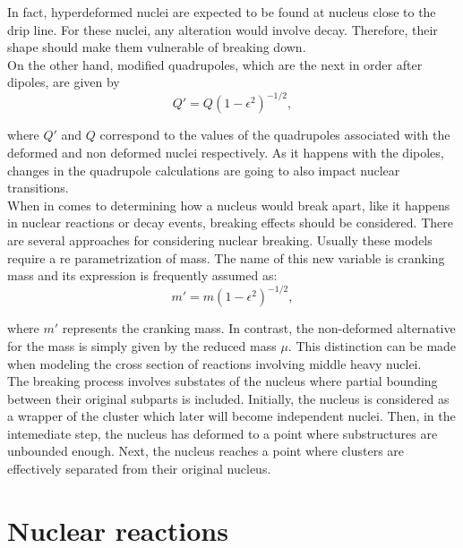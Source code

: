 \documentclass[openany]{book}
\begin{document}
In fact, hyperdeformed nuclei are expected to be found at nucleus close to the drip line. For these nuclei, any alteration would involve decay. Therefore, their shape should make them vulnerable of breaking down. \\

On the other hand, modified quadrupoles, which are the next in order after dipoles,  are given by \\

 \begin{equation}\label{eq:nuclearDeformation_quadrupole}
 	Q' = Q (1 - \epsilon^2)^{-1/2},
 \end{equation} 

where $Q'$ and $Q$ correspond to the values of the quadrupoles associated with the deformed and non deformed nuclei respectively. As it happens with the dipoles, changes in the quadrupole calculations are going to also impact nuclear transitions. \\

When in comes to determining how a nucleus would break apart, like it happens in nuclear reactions or decay events, breaking effects should be considered. There are several approaches for considering nuclear breaking. Usually these models require a re parametrization of mass. The name of this new variable is cranking mass and its expression is frequently assumed as: \\

 \begin{equation}\label{eq:nuclearDeformation_mass}
	m' = m(1 - \epsilon^2)^{-1/2},
\end{equation} 

where $m'$ represents the cranking mass. In contrast, the non-deformed alternative for the mass is simply given by the reduced mass $\mu$. This distinction can be made when modeling the cross section of reactions involving middle heavy nuclei. \\

The breaking process involves substates of the nucleus where partial bounding between their original subparts is included. Initially, the nucleus is considered as a wrapper of the cluster which later will become independent nuclei. Then, in the intemediate step, the nucleus has deformed to a point where substructures are unbounded enough. Next, the nucleus reaches a point where clusters are effectively separated from their original nucleus. 

\section{Nuclear reactions} \label{sec:nuclearReactions}
\end{document}
